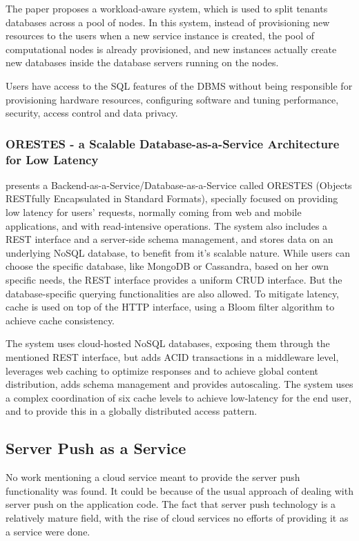 The paper proposes a workload-aware system, which is used to split tenants databases across a pool of nodes. In this system, instead of provisioning new resources to the users when a new service instance is created, the pool of computational nodes is already provisioned, and new instances actually create new databases inside the database servers running on the nodes.

Users have access to the SQL features of the DBMS without being responsible for provisioning hardware resources, configuring software and tuning performance, security, access control and data privacy.

\subsubsection{ORESTES - a Scalable Database-as-a-Service Architecture for Low Latency}

 presents a Backend-as-a-Service/Database-as-a-Service called ORESTES (Objects RESTfully Encapsulated in Standard Formats), specially focused on providing low latency for users' requests, normally coming from web and mobile applications, and with read-intensive operations. The system also includes a REST interface and a server-side schema management, and stores data on an underlying NoSQL database, to benefit from it's scalable nature. While users can choose the specific database, like MongoDB or Cassandra, based on her own specific needs, the REST interface provides a uniform CRUD interface. But the database-specific querying functionalities are also allowed. To mitigate latency, cache is used on top of the HTTP interface, using a Bloom filter algorithm to achieve cache consistency.

The system uses cloud-hosted NoSQL databases, exposing them through the mentioned REST interface, but adds ACID transactions in a middleware level, leverages web caching to optimize responses and to achieve global content distribution, adds schema management and provides autoscaling. The system uses a complex coordination of six cache levels to achieve low-latency for the end user, and to provide this in a globally distributed access pattern.

\subsection{Server Push as a Service}

No work mentioning a cloud service meant to provide the server push functionality was found. It could be because of the usual approach of dealing with server push on the application code. The fact that server push technology is a relatively mature field, with the rise of cloud services no efforts of providing it as a service were done.
